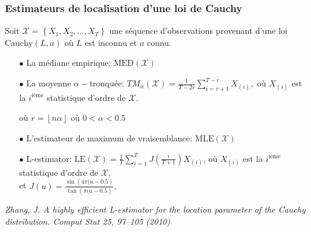 \documentclass[8pt,sans,aspectratio=169]{beamer}
\begin{document}
\begin{frame}

\frametitle{Estimateurs de localisation d'une loi de Cauchy}

Soit $\mathcal{X}=\left\{X_1,X_2,...,X_T\right\}$ une séquence d'observations provenant d'une loi $\mathrm{Cauchy}(L,a)$ où $L$ est inconnu et $a$ connu.

\vfill
\pause

\begin{itemize}

\vfill
\item[$\bullet$]
La médiane empirique: $\mathrm{MED}(\mathcal{X})$

\pause
\vfill
\item[$\bullet$]
La moyenne $\alpha-$tronquée: $\displaystyle TM_{\alpha}(\mathcal X)=\frac{1}{T-2r}\sum_{i=r+1}^{T-r}X_{(i)},$ où $X_{(i)}$ est la $i^\text{ième}$ statistique d'ordre de $\mathcal{X}.$

où $r=\left\lfloor n\alpha\right\rfloor$ où $0<\alpha<0.5$ 

\pause
\vfill
\item[$\bullet$]
L'estimateur de maximum de vraisemblance: $\mathrm{MLE}(\mathcal{X})$

\pause
\vfill
\item[$\bullet$]
L-estimator: $\displaystyle\mathrm{LE}(\mathcal{X})=\frac{1}{T}\sum_{i=1}^T J\left(\frac{i}{T+1}\right) X_{(i)}$, où $X_{(i)}$ est la $i^\text{ième}$ statistique d'ordre de $\mathcal{X},$\\

et $J(u)=\frac{\sin\left(4\pi(u-0.5\right)}{\tan\left(\pi(u-0.5\right)},$ 
\end{itemize}

\pause
\vfill

{\it Zhang, J. A highly efficient L-estimator for the location parameter of the Cauchy distribution. Comput Stat 25, 97–105 (2010)}

\end{frame}
\end{document}

